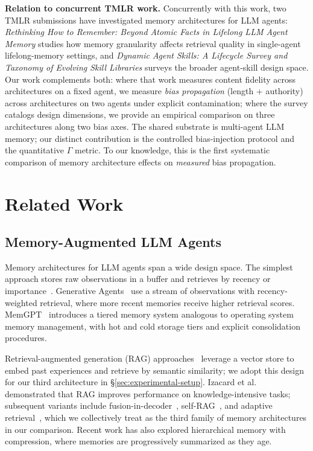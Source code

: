 \documentclass[11pt]{article}
\begin{document}
\noindent\textbf{Relation to concurrent TMLR work.}
Concurrently with this work, two TMLR submissions have investigated memory architectures for LLM agents: \textit{Rethinking How to Remember: Beyond Atomic Facts in Lifelong LLM Agent Memory} studies how memory granularity affects retrieval quality in single-agent lifelong-memory settings, and \textit{Dynamic Agent Skills: A Lifecycle Survey and Taxonomy of Evolving Skill Libraries} surveys the broader agent-skill design space. Our work complements both: where that work measures content fidelity across architectures on a fixed agent, we measure \emph{bias propagation} (length + authority) across architectures on two agents under explicit contamination; where the survey catalogs design dimensions, we provide an empirical comparison on three architectures along two bias axes. The shared substrate is multi-agent LLM memory; our distinct contribution is the controlled bias-injection protocol and the quantitative $\Gamma$ metric. To our knowledge, this is the first systematic comparison of memory architecture effects on \emph{measured} bias propagation.


\section{Related Work}

\subsection{Memory-Augmented LLM Agents}

Memory architectures for LLM agents span a wide design space. The simplest approach stores raw observations in a buffer and retrieves by recency or importance~\cite{park2023generative}. Generative Agents~\cite{park2023generative} use a stream of observations with recency-weighted retrieval, where more recent memories receive higher retrieval scores. MemGPT~\cite{packer2023memgpt} introduces a tiered memory system analogous to operating system memory management, with hot and cold storage tiers and explicit consolidation procedures.

Retrieval-augmented generation (RAG) approaches~\cite{lewis2020rag} leverage a vector store to embed past experiences and retrieve by semantic similarity; we adopt this design for our third architecture in \S\ref{sec:experimental-setup}. Izacard et al.~\cite{izacard2022fusion} demonstrated that RAG improves performance on knowledge-intensive tasks; subsequent variants include fusion-in-decoder~\cite{izacard2022fusion}, self-RAG~\cite{asai2023selfrag}, and adaptive retrieval~\cite{jiang2023active}, which we collectively treat as the third family of memory architectures in our comparison. Recent work has also explored hierarchical memory with compression, where memories are progressively summarized as they age.
\end{document}
